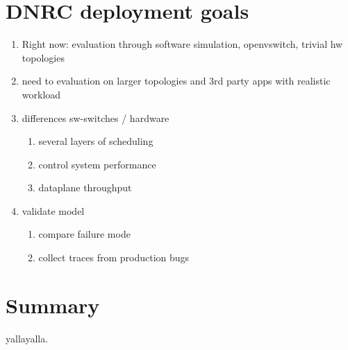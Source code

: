 \documentclass{sig-alternate-10pt}
\begin{document}
\section{DNRC deployment goals}

\begin{enumerate}
\item Right now: evaluation through software simulation, openvswitch,
trivial hw topologies
\item  need to evaluation on larger topologies and 3rd party apps with realistic
workload
\item  differences sw-switches / hardware
\begin{enumerate}
\item several layers of scheduling
\item control system performance
\item dataplane throughput
\end{enumerate}

\item validate model
\begin{enumerate}
\item compare failure mode
\item collect traces from production bugs
\end{enumerate}
\end{enumerate}

\section{Summary}

yallayalla.
\end{document}
